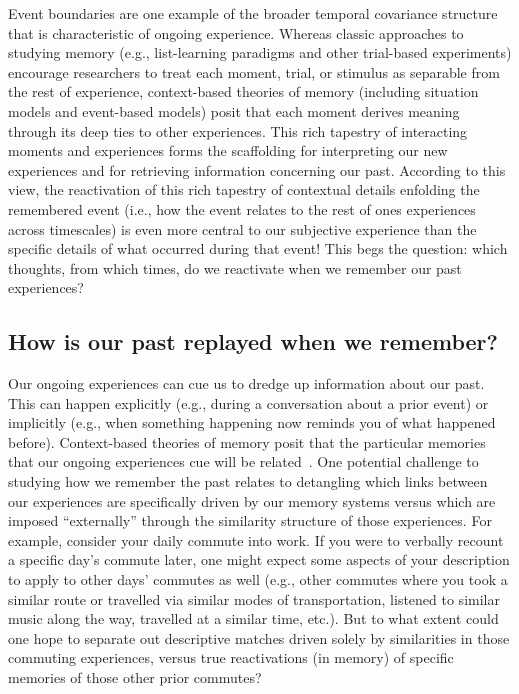 \documentclass{article}
\begin{document}
Event boundaries are one example of the broader temporal covariance structure that is characteristic of ongoing experience.  Whereas classic approaches to studying memory (e.g., list-learning paradigms and other trial-based experiments) encourage researchers to treat each moment, trial, or stimulus as separable from the rest of experience, context-based theories of memory (including situation models and event-based models) posit that each moment derives meaning through its deep ties to other experiences.  This rich tapestry of interacting moments and experiences forms the scaffolding for interpreting our new experiences and for retrieving information concerning our past.  According to this view, the reactivation of this rich tapestry of contextual details enfolding the remembered event (i.e., how the event relates to the rest of ones experiences across timescales) is even more central to our subjective experience than the specific details of what occurred during that event!  This begs the question: which thoughts, from which times, do we reactivate when we remember our past experiences?

\subsection*{How is our past replayed when we remember?}
Our ongoing experiences can cue us to dredge up information about our past.  This can happen explicitly (e.g., during a conversation about a prior event) or implicitly (e.g., when something happening now reminds you of what happened before).  Context-based theories of memory posit that the particular memories that our ongoing experiences cue will be related~\citep[contextually, semantically, functionally, etc.; e.g., ][]{PolyEtal09}.  One potential challenge to studying how we remember the past relates to detangling which links between our experiences are specifically driven by our memory systems versus which are imposed ``externally'' through the similarity structure of those experiences.  For example, consider your daily commute into work.  If you were to verbally recount a specific day's commute later, one might expect some aspects of your description to apply to other days' commutes as well (e.g., other commutes where you took a similar route or travelled via similar modes of transportation, listened to similar music along the way, travelled at a similar time, etc.).  But to what extent could one hope to separate out descriptive matches driven solely by similarities in those commuting experiences, versus true reactivations (in memory) of specific memories of those other prior commutes?
\end{document}
